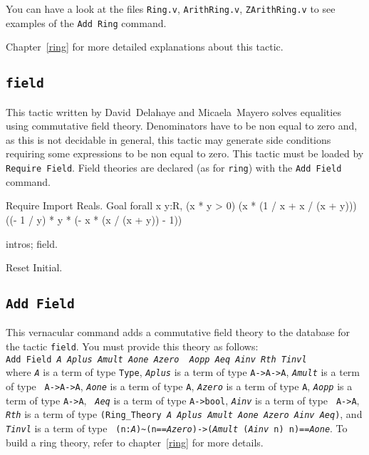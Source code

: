 You can have a look at the files \texttt{Ring.v},
\texttt{ArithRing.v}, \texttt{ZArithRing.v} to see examples of the
\texttt{Add Ring} command.

\SeeAlso Chapter~\ref{ring} for more detailed explanations about this tactic.

\subsection{\tt field}

This tactic written by David~Delahaye and Micaela~Mayero solves equalities
using commutative field theory. Denominators have to be non equal to zero and,
as this is not decidable in general, this tactic may generate side conditions
requiring some expressions to be non equal to zero. This tactic must be loaded
by {\tt Require Field}. Field theories are declared (as for {\tt ring}) with
the {\tt Add Field} command.

\Example
\begin{coq_example*}
Require Import Reals.
Goal
  forall x y:R,
    (x * y > 0)%
    (x * (1 / x + x / (x + y)))%
    ((- 1 / y) * y * (- x * (x / (x + y)) - 1))%
\end{coq_example*}

\begin{coq_example}
intros; field.
\end{coq_example}

\begin{coq_eval}
Reset Initial.
\end{coq_eval}

\subsection{\tt Add Field}

This vernacular command adds a commutative field theory to the database for the
tactic {\tt field}. You must provide this theory as follows:\\

{\tt Add Field {\it A} {\it Aplus} {\it Amult} {\it Aone} {\it Azero} {\it
Aopp} {\it Aeq} {\it Ainv} {\it Rth} {\it Tinvl}}\\

\noindent where {\tt {\it A}} is a term of type {\tt Type}, {\tt {\it Aplus}}
is a term of type {\tt A->A->A}, {\tt {\it Amult}} is a term of type {\tt
A->A->A}, {\tt {\it Aone}} is a term of type {\tt A}, {\tt {\it Azero}} is a
term of type {\tt A}, {\tt {\it Aopp}} is a term of type {\tt A->A}, {\tt {\it
Aeq}} is a term of type {\tt A->bool}, {\tt {\it Ainv}} is a term of type {\tt
A->A}, {\tt {\it Rth}} is a term of type {\tt (Ring\_Theory {\it A Aplus Amult
Aone Azero Ainv Aeq})}, and {\tt {\it Tinvl}} is a term of type {\tt
(n:{\it A}){\~{}}(n=={\it Azero})->({\it Amult} ({\it Ainv} n) n)=={\it Aone}}.
To build a ring theory, refer to chapter~\ref{ring} for more details.

